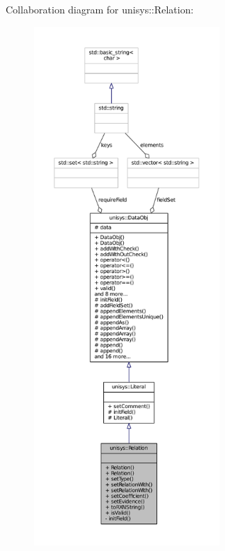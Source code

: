 Collaboration diagram for unisys\-:\-:Relation\-:
\nopagebreak
\begin{figure}[H]
\begin{center}
\leavevmode
\includegraphics[height=550pt]{classunisys_1_1Relation__coll__graph}
\end{center}
\end{figure}
